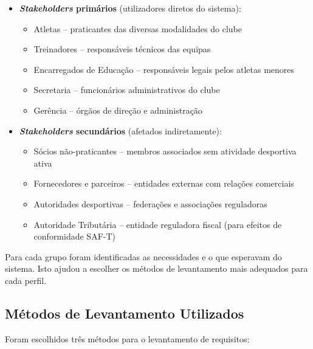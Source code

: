 \begin{itemize}
    \item \textbf{\textit{Stakeholders} primários} (utilizadores diretos do sistema):
    \begin{itemize}
        \item Atletas -- praticantes das diversas modalidades do clube
        \item Treinadores -- responsáveis técnicos das equipas
        \item Encarregados de Educação -- responsáveis legais pelos atletas menores
        \item Secretaria -- funcionários administrativos do clube
        \item Gerência -- órgãos de direção e administração
    \end{itemize}

    \item \textbf{\textit{Stakeholders} secundários} (afetados indiretamente):
    \begin{itemize}
        \item Sócios não-praticantes -- membros associados sem atividade desportiva ativa
        \item Fornecedores e parceiros -- entidades externas com relações comerciais
        \item Autoridades desportivas -- federações e associações reguladoras
        \item Autoridade Tributária -- entidade reguladora fiscal (para efeitos de conformidade SAF-T)
    \end{itemize}
\end{itemize}

Para cada grupo foram identificadas as necessidades e o que esperavam do sistema. Isto ajudou a escolher os métodos de levantamento mais adequados para cada perfil.




\subsection{Métodos de Levantamento Utilizados}

Foram escolhidos três métodos para o levantamento de requisitos:

